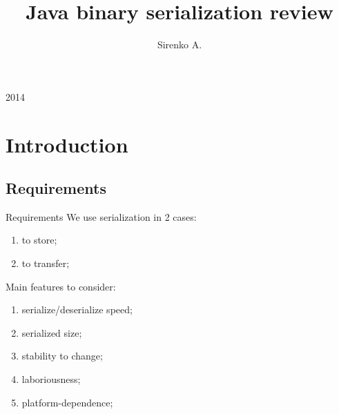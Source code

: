 \documentclass[8pt]{beamer}
\begin{document}
\title{Java binary serialization review}

\author{Sirenko A.}

\begin{frame}
  \titlepage
  \begin{center}
    2014
  \end{center}
\end{frame}

\section{Introduction}
\renewcommand{\partname}{Requirements}
\subsection{\partname}
\begin{frame}{\partname}
  We use serialization in 2 cases:
  \begin{enumerate}
    \item to store;
    \item to transfer;
  \end{enumerate}

  Main features to consider:
  \begin{enumerate}
    \item serialize/deserialize speed;
    \item serialized size;
    \item stability to change;
    \item laboriousness;
    \item platform-dependence;
  \end{enumerate}

\end{frame}

\renewcommand{\partname}{JDK tools}
\end{document}

